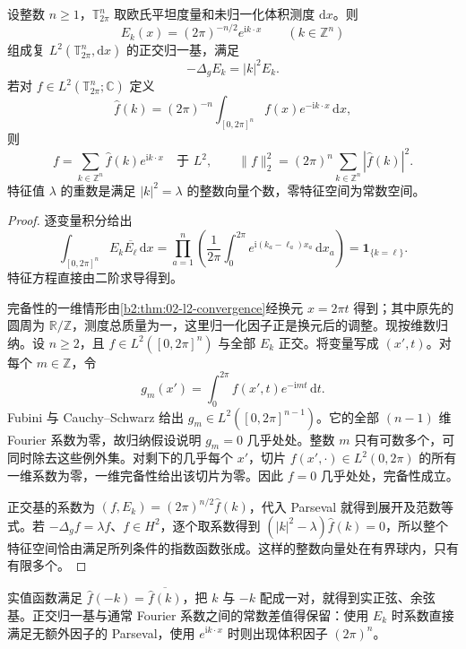 \begin{proposition}\label{b2:prop:26-torus-spectrum}
设整数 \(n\geq1\)，\(\mathbb T_{2\pi}^n\) 取欧氏平坦度量和未归一化体积测度 \(\mathrm dx\)。则
\[
 E_k(x)=(2\pi)^{-n/2}e^{\mathrm i k\cdot x}\qquad(k\in\mathbb Z^n)
\]
组成复 \(L^2(\mathbb T_{2\pi}^n,\mathrm dx)\) 的正交归一基，满足
\[
 -\Delta_gE_k=|k|^2E_k.
\]
若对 \(f\in L^2(\mathbb T_{2\pi}^n;\mathbb C)\) 定义
\[
 \widehat f(k)=(2\pi)^{-n}\int_{[0,2\pi]^n}f(x)e^{-\mathrm ik\cdot x}\,\mathrm dx,
\]
则
\[
 f=\sum_{k\in\mathbb Z^n}\widehat f(k)e^{\mathrm ik\cdot x}\quad\text{于 }L^2,
 \qquad
 \|f\|_2^2=(2\pi)^n\sum_{k\in\mathbb Z^n}|\widehat f(k)|^2.
\]
特征值 \(\lambda\) 的重数是满足 \(|k|^2=\lambda\) 的整数向量个数，零特征空间为常数空间。
\end{proposition}
\begin{proof}
逐变量积分给出
\[
 \int_{[0,2\pi]^n}E_k\overline{E_\ell}\,\mathrm dx
   =\prod_{a=1}^n\left(\frac1{2\pi}\int_0^{2\pi}e^{\mathrm i(k_a-\ell_a)x_a}\,\mathrm dx_a\right)
   =\mathbf1_{\{k=\ell\}}.
\]
特征方程直接由二阶求导得到。

完备性的一维情形由\cref{b2:thm:02-l2-convergence}经换元 \(x=2\pi t\) 得到；其中原先的圆周为 \(\mathbb R/\mathbb Z\)，测度总质量为一，这里归一化因子正是换元后的调整。现按维数归纳。设 \(n\geq2\)，且 \(f\in L^2([0,2\pi]^n)\) 与全部 \(E_k\) 正交。将变量写成 \((x',t)\)。对每个 \(m\in\mathbb Z\)，令
\[
 g_m(x')=\int_0^{2\pi}f(x',t)e^{-\mathrm imt}\,\mathrm dt.
\]
Fubini 与 Cauchy--Schwarz 给出 \(g_m\in L^2([0,2\pi]^{n-1})\)。它的全部 \((n-1)\) 维 Fourier 系数为零，故归纳假设说明 \(g_m=0\) 几乎处处。整数 \(m\) 只有可数多个，可同时除去这些例外集。对剩下的几乎每个 \(x'\)，切片 \(f(x',\cdot)\in L^2(0,2\pi)\) 的所有一维系数为零，一维完备性给出该切片为零。因此 \(f=0\) 几乎处处，完备性成立。

正交基的系数为 \((f,E_k)=(2\pi)^{n/2}\widehat f(k)\)，代入 Parseval 就得到展开及范数等式。若 \(-\Delta_gf=\lambda f\)、\(f\in H^2\)，逐个取系数得到 \((|k|^2-\lambda)\widehat f(k)=0\)，所以整个特征空间恰由满足所列条件的指数函数张成。这样的整数向量处在有界球内，只有有限多个。
\end{proof}

实值函数满足 \(\widehat f(-k)=\overline{\widehat f(k)}\)，把 \(k\) 与 \(-k\) 配成一对，就得到实正弦、余弦基。正交归一基与通常 Fourier 系数之间的常数差值得保留：使用 \(E_k\) 时系数直接满足无额外因子的 Parseval，使用 \(e^{\mathrm ik\cdot x}\) 时则出现体积因子 \((2\pi)^n\)。

\ProseParagraphBreak

